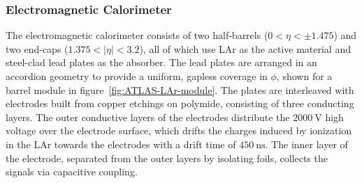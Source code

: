 \subsubsection{Electromagnetic Calorimeter}\label{sec:ATLAS-calorimeters-ecal}

The electromagnetic calorimeter consists of two half-barrels ($0<\eta<\pm1.475$) and two end-caps ($1.375<|\eta|<3.2$), all of which use LAr as the active material and steel-clad lead plates as the absorber. The lead plates are arranged in an accordion geometry to provide a uniform, gapless coverage in $\phi$, shown for a barrel module in figure~\ref{fig:ATLAS-LAr-module}. The plates are interleaved with electrodes built from copper etchings on polymide, consisting of three conducting layers. The outer conductive layers of the electrodes distribute the $2000~\mbox{V}$ high voltage over the electrode surface, which drifts the charges induced by ionization in the LAr towards the electrodes with a drift time of $450~\mbox{ns}$. The inner layer of the electrode, separated from the outer layers by isolating foils, collects the signals via capacitive coupling.

